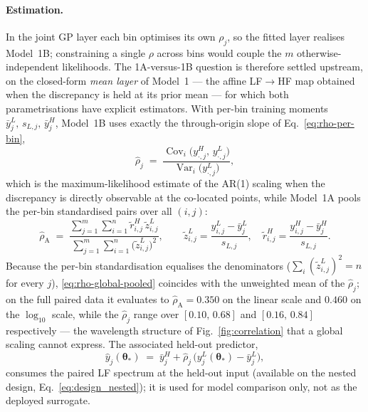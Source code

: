 \paragraph{Estimation.}
In the joint GP layer each bin optimises its own $\rho_j$, so the fitted layer
realises Model~1B; constraining a single $\rho$ across bins would couple the
$m$ otherwise-independent likelihoods. The 1A-versus-1B question is therefore
settled upstream, on the closed-form \emph{mean layer} of Model~1 --- the
affine LF$\to$HF map obtained when the discrepancy is held at its prior mean
--- for which both parametrisations have explicit estimators. With per-bin
training moments $\bar y^{L}_{j},\,s_{L,j},\,\bar y^{H}_{j}$, Model~1B uses
exactly the through-origin slope of Eq.~\ref{eq:rho-per-bin},
\begin{equation}
  \hat\rho_j
  \;=\;
  \frac{\operatorname{Cov}_i\!\bigl(y^{H}_{\cdot,j},\,y^{L}_{\cdot,j}\bigr)}
       {\operatorname{Var}_i\!\bigl(y^{L}_{\cdot,j}\bigr)},
\end{equation}
which is the maximum-likelihood estimate of the AR(1) scaling when the
discrepancy is directly observable at the co-located points, while Model~1A
pools the per-bin standardised pairs over all $(i,j)$:
\begin{equation}
  \hat\rho_{\mathrm{A}}
  \;=\;
  \frac{\sum_{j=1}^{m}\sum_{i=1}^{n}
        \tilde r^{H}_{i,j}\,\tilde z^{L}_{i,j}}
       {\sum_{j=1}^{m}\sum_{i=1}^{n}\bigl(\tilde z^{L}_{i,j}\bigr)^{2}},
  \qquad
  \tilde z^{L}_{i,j}=\frac{y^{L}_{i,j}-\bar y^{L}_{j}}{s_{L,j}},
  \quad
  \tilde r^{H}_{i,j}=\frac{y^{H}_{i,j}-\bar y^{H}_{j}}{s_{L,j}} .
  \label{eq:rho-global-pooled}
\end{equation}
Because the per-bin standardisation equalises the denominators
($\sum_i (\tilde z^{L}_{i,j})^2 = n$ for every $j$),
\eqref{eq:rho-global-pooled} coincides with the unweighted mean of the
$\hat\rho_j$; on the full paired data it evaluates to
$\hat\rho_{\mathrm{A}}=0.350$ on the linear scale and $0.460$ on the
$\log_{10}$ scale, while the $\hat\rho_j$ range over $[0.10,\,0.68]$ and
$[0.16,\,0.84]$ respectively --- the wavelength structure of
Fig.~\ref{fig:correlation} that a global scaling cannot express. The
associated held-out predictor,
\begin{equation}
  \hat y_{j}(\boldsymbol\theta_\ast)
  \;=\;
  \bar y^{H}_{j} + \hat\rho_j\,\bigl(y^{L}_{j}(\boldsymbol\theta_\ast)
  - \bar y^{L}_{j}\bigr),
  \label{eq:rho-layer-predictor}
\end{equation}
consumes the paired LF spectrum at the held-out input (available on the nested
design, Eq.~\ref{eq:design_nested}); it is used for model comparison only, not
as the deployed surrogate.

